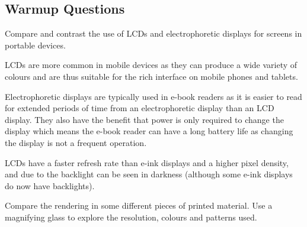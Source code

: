 \documentclass{supervision}
\begin{document}
\subsection*{Warmup Questions}
\begin{questions}
  \question Compare and contrast the use of LCDs and electrophoretic displays
    for screens in portable devices.
    \begin{solution}
      LCDs are more common in mobile devices as they can produce a wide
      variety of colours and are thus suitable for the rich interface on
      mobile phones and tablets.

      Electrophoretic displays are typically used in e-book readers as it is
      easier to read for extended periods of time from an electrophoretic
      display than an LCD display. They also have the benefit that power is
      only required to change the display which means the e-book reader can
      have a long battery life as changing the display is not a frequent
      operation.

      LCDs have a faster refresh rate than e-ink displays and a higher pixel
      density, and due to the backlight can be seen in darkness (although some
      e-ink displays do now have backlights).
    \end{solution}

  \question Compare the rendering in some different pieces of printed
    material. Use a magnifying glass to explore the resolution, colours and
    patterns used.

\end{questions}
\end{document}
